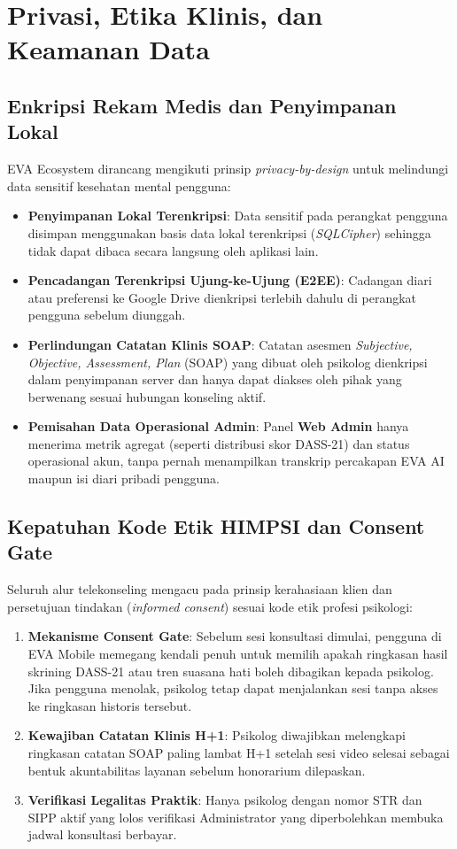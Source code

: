 \chapter{Privasi, Etika Klinis, dan Keamanan Data}
\label{chap:privasi-etika}

\section{Enkripsi Rekam Medis dan Penyimpanan Lokal}
EVA Ecosystem dirancang mengikuti prinsip \textit{privacy-by-design} untuk melindungi data sensitif kesehatan mental pengguna:
\begin{itemize}[leftmargin=1.4em]
  \item \textbf{Penyimpanan Lokal Terenkripsi}: Data sensitif pada perangkat pengguna disimpan menggunakan basis data lokal terenkripsi (\textit{SQLCipher}) sehingga tidak dapat dibaca secara langsung oleh aplikasi lain.
  \item \textbf{Pencadangan Terenkripsi Ujung-ke-Ujung (E2EE)}: Cadangan diari atau preferensi ke Google Drive dienkripsi terlebih dahulu di perangkat pengguna sebelum diunggah.
  \item \textbf{Perlindungan Catatan Klinis SOAP}: Catatan asesmen \textit{Subjective, Objective, Assessment, Plan} (SOAP) yang dibuat oleh psikolog dienkripsi dalam penyimpanan server dan hanya dapat diakses oleh pihak yang berwenang sesuai hubungan konseling aktif.
  \item \textbf{Pemisahan Data Operasional Admin}: Panel \textbf{Web Admin} hanya menerima metrik agregat (seperti distribusi skor DASS-21) dan status operasional akun, tanpa pernah menampilkan transkrip percakapan EVA AI maupun isi diari pribadi pengguna.
\end{itemize}

\section{Kepatuhan Kode Etik HIMPSI dan Consent Gate}
Seluruh alur telekonseling mengacu pada prinsip kerahasiaan klien dan persetujuan tindakan (\textit{informed consent}) sesuai kode etik profesi psikologi:
\begin{enumerate}[leftmargin=1.4em]
  \item \textbf{Mekanisme Consent Gate}: Sebelum sesi konsultasi dimulai, pengguna di EVA Mobile memegang kendali penuh untuk memilih apakah ringkasan hasil skrining DASS-21 atau tren suasana hati boleh dibagikan kepada psikolog. Jika pengguna menolak, psikolog tetap dapat menjalankan sesi tanpa akses ke ringkasan historis tersebut.
  \item \textbf{Kewajiban Catatan Klinis H+1}: Psikolog diwajibkan melengkapi ringkasan catatan SOAP paling lambat H+1 setelah sesi video selesai sebagai bentuk akuntabilitas layanan sebelum honorarium dilepaskan.
  \item \textbf{Verifikasi Legalitas Praktik}: Hanya psikolog dengan nomor STR dan SIPP aktif yang lolos verifikasi Administrator yang diperbolehkan membuka jadwal konsultasi berbayar.
\end{enumerate}

